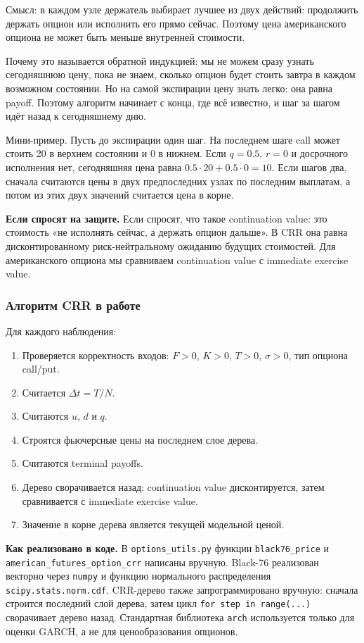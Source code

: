 \documentclass[11pt,a4paper]{article}
\newcommand{\answer}[1]{%
  \vspace{0.15em}
  \noindent\colorbox{softgreen}{%
    \parbox{\dimexpr\linewidth-2\fboxsep\relax}{\textbf{Если спросят на защите.} #1}%
  }\vspace{0.2em}
}
\newcommand{\impl}[1]{%
  \vspace{0.15em}
  \noindent\colorbox{softblue}{%
    \parbox{\dimexpr\linewidth-2\fboxsep\relax}{\textbf{Как реализовано в коде.} #1}%
  }\vspace{0.2em}
}
\begin{document}
Смысл: в каждом узле держатель выбирает лучшее из двух действий: продолжить держать опцион или исполнить его прямо сейчас. Поэтому цена американского опциона не может быть меньше внутренней стоимости.

Почему это называется обратной индукцией: мы не можем сразу узнать сегодняшнюю цену, пока не знаем, сколько опцион будет стоить завтра в каждом возможном состоянии. Но на самой экспирации цену знать легко: она равна payoff. Поэтому алгоритм начинает с конца, где всё известно, и шаг за шагом идёт назад к сегодняшнему дню.

Мини-пример. Пусть до экспирации один шаг. На последнем шаге call может стоить 20 в верхнем состоянии и 0 в нижнем. Если $q=0.5$, $r=0$ и досрочного исполнения нет, сегодняшняя цена равна $0.5\cdot20+0.5\cdot0=10$. Если шагов два, сначала считаются цены в двух предпоследних узлах по последним выплатам, а потом из этих двух значений считается цена в корне.

\answer{Если спросят, что такое continuation value: это стоимость «не исполнять сейчас, а держать опцион дальше». В CRR она равна дисконтированному риск-нейтральному ожиданию будущих стоимостей. Для американского опциона мы сравниваем continuation value с immediate exercise value.}

\subsubsection{Алгоритм CRR в работе}

Для каждого наблюдения:

\begin{enumerate}
    \item Проверяется корректность входов: $F>0$, $K>0$, $T>0$, $\sigma>0$, тип опциона call/put.
    \item Считается $\Delta t=T/N$.
    \item Считаются $u$, $d$ и $q$.
    \item Строятся фьючерсные цены на последнем слое дерева.
    \item Считаются terminal payoffs.
    \item Дерево сворачивается назад: continuation value дисконтируется, затем сравнивается с immediate exercise value.
    \item Значение в корне дерева является текущей модельной ценой.
\end{enumerate}

\impl{В \texttt{options\_utils.py} функции \texttt{black76\_price} и \texttt{american\_futures\_option\_crr} написаны вручную. Black-76 реализован векторно через \texttt{numpy} и функцию нормального распределения \texttt{scipy.stats.norm.cdf}. CRR-дерево также запрограммировано вручную: сначала строится последний слой дерева, затем цикл \texttt{for step in range(...)} сворачивает дерево назад. Стандартная библиотека \texttt{arch} используется только для оценки GARCH, а не для ценообразования опционов.}
\end{document}
